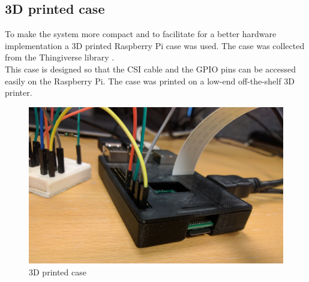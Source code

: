 \subsection{3D printed case}
To make the system more compact and to facilitate for a better hardware implementation a 3D printed Raspberry Pi case was used. The case was collected from the Thingiverse library \cite{case}. \\

This case is designed so that the CSI cable and the GPIO pins can be accessed easily on the Raspberry Pi. The case was printed on a low-end off-the-shelf 3D printer.

\begin{figure}[H]
  \centering
  \includegraphics[width=1\textwidth]{fig/case}
  \caption{3D printed case}
  \label{fig:case}
\end{figure}













